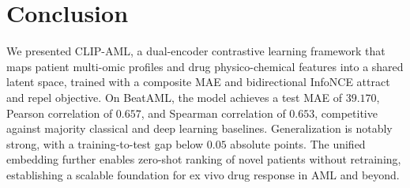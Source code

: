 \documentclass[sigconf,authordraft]{acmart}
\begin{document}
\section{Conclusion}
We presented CLIP-AML, a dual-encoder contrastive learning framework that maps patient multi-omic profiles and drug physico-chemical features into a shared latent space, trained with a composite MAE and bidirectional InfoNCE attract and repel objective. On BeatAML, the model achieves a test MAE of $39.170$, Pearson correlation of $0.657$, and Spearman correlation of $0.653$, competitive against majority classical and deep learning baselines. Generalization is notably strong, with a training-to-test gap below $0.05$ absolute points. The unified embedding further enables zero-shot ranking of novel patients without retraining, establishing a scalable foundation for ex vivo drug response in AML and beyond.

\end{document}
